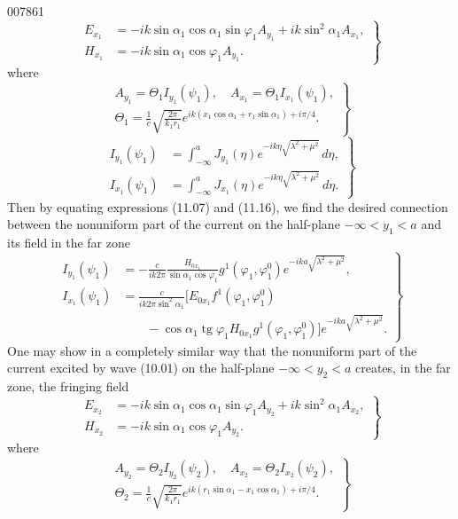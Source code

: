 \begin{scanpage}{0078}{61}
\[
\left.\begin{aligned}
E_{x_1}&=-ik\sin\alpha_1\cos\alpha_1\sin\varphi_1 A_{y_1}+ik\sin^2\alpha_1 A_{x_1},\\
H_{x_1}&=-ik\sin\alpha_1\cos\varphi_1 A_{y_1}.
\end{aligned}\right\}\tag{11.16}
\]
where
\[
\left.\begin{gathered}
A_{y_1}=\Theta_1 I_{y_1}(\psi_1),\quad A_{x_1}=\Theta_1 I_{x_1}(\psi_1),\\
\Theta_1=\frac1c\sqrt{\frac{2\pi}{k_1r_1}}e^{ik(x_1\cos\alpha_1+r_1\sin\alpha_1)+i\pi/4}.
\end{gathered}\right\}\tag{11.17}
\]
\[
\left.\begin{aligned}
I_{y_1}(\psi_1)&=\int_{-\infty}^a J_{y_1}(\eta)e^{-ik\eta\sqrt{\lambda^2+\mu^2}}\,d\eta,\\
I_{x_1}(\psi_1)&=\int_{-\infty}^a J_{x_1}(\eta)e^{-ik\eta\sqrt{\lambda^2+\mu^2}}\,d\eta.
\end{aligned}\right\}\tag{11.18}
\]
Then by equating expressions (11.07) and (11.16), we find the desired connection between the nonuniform part of the current on the half-plane $-\infty<y_1<a$ and its field in the far zone
\[
\left.\begin{aligned}
I_{y_1}(\psi_1)&=-\frac{c}{ik2\pi}\frac{H_{0x_1}}{\sin\alpha_1\cos\varphi_1}g^1(\varphi_1,\varphi_1^0)e^{-ika\sqrt{\lambda^2+\mu^2}},\\
I_{x_1}(\psi_1)&=\frac{c}{ik2\pi\sin^2\alpha_1}\bigl[E_{0x_1}f^1(\varphi_1,\varphi_1^0)\\
&\qquad-\cos\alpha_1\operatorname{tg}\varphi_1 H_{0x_1}g^1(\varphi_1,\varphi_1^0)\bigr]e^{-ika\sqrt{\lambda^2+\mu^2}}.
\end{aligned}\right\}\tag{11.19}
\]
One may show in a completely similar way that the nonuniform part of the current excited by wave (10.01) on the half-plane $-\infty<y_2<a$ creates, in the far zone, the fringing field
\[
\left.\begin{aligned}
E_{x_2}&=-ik\sin\alpha_1\cos\alpha_1\sin\varphi_1 A_{y_2}+ik\sin^2\alpha_1 A_{x_2},\\
H_{x_2}&=-ik\sin\alpha_1\cos\varphi_1 A_{y_2}.
\end{aligned}\right\}\tag{11.20}
\]
where
\[
\left.\begin{gathered}
A_{y_2}=\Theta_2 I_{y_2}(\psi_2),\quad A_{x_2}=\Theta_2 I_{x_2}(\psi_2),\\
\Theta_2=\frac1c\sqrt{\frac{2\pi}{k_1r_1}}e^{ik(r_1\sin\alpha_1-x_1\cos\alpha_1)+i\pi/4}.
\end{gathered}\right\}\tag{11.21}
\]
\end{scanpage}
